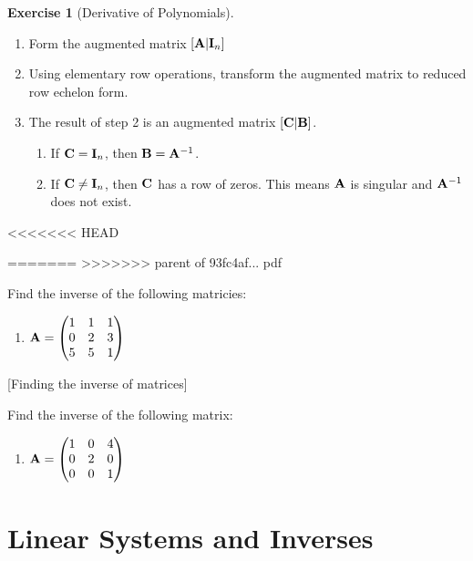 \documentclass[]{book}
\providecommand{\tightlist}{%
  \setlength{\itemsep}{0pt}\setlength{\parskip}{0pt}}
\theoremstyle{definition}
\theoremstyle{definition}
\theoremstyle{definition}
\newtheorem{exercise}{Exercise}[chapter]
\theoremstyle{remark}
\begin{document}
\begin{exercise}[Derivative of Polynomials]
\begin{enumerate}
\def\labelenumi{\arabic{enumi}.}
\item
  Form the augmented matrix \([ {\bf A} | {\bf I}_n]\)
\item
  Using elementary row operations, transform the augmented matrix to reduced row echelon form.
\item
  The result of step 2 is an augmented matrix \([ {\bf C} | {\bf B} ]\).

  \begin{enumerate}
  \def\labelenumii{\alph{enumii}.}
  \item
    If \({\bf C}={\bf I}_n\), then \({\bf B}={\bf A}^{-1}\).
  \item
    If \({\bf C}\ne{\bf I}_n\), then \(\bf C\) has a row of zeros. This means \({\bf A}\) is singular and \({\bf A}^{-1}\) does not exist.
  \end{enumerate}
\end{enumerate}
<<<<<<< HEAD
\end{exercise}
=======
>>>>>>> parent of 93fc4af... pdf

\protect\hypertarget{exm:inverse}{}{\label{exm:inverse} }
Find the inverse of the following matricies:

\begin{enumerate}
\def\labelenumi{\arabic{enumi}.}
\tightlist
\item
  \({\bf A}=\begin{pmatrix} 1&1&1\\0&2&3\\5&5&1 \end{pmatrix}\)
\end{enumerate}

[Finding the inverse of matrices]
\protect\hypertarget{exr:inverse1}{}{\label{exr:inverse1} {} }

Find the inverse of the following matrix:

\begin{enumerate}
\def\labelenumi{\arabic{enumi}.}
\tightlist
\item
  \({\bf A}=\begin{pmatrix} 1&0&4\\0&2&0\\0&0&1 \end{pmatrix}\)
\end{enumerate}

\hypertarget{linear-systems-and-inverses}{%
\section{Linear Systems and Inverses}\label{linear-systems-and-inverses}}
\end{document}
